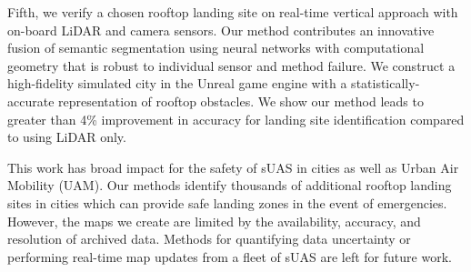 Fifth, we verify a chosen rooftop landing site on real-time vertical approach with on-board LiDAR and camera sensors. Our method contributes an innovative fusion of semantic segmentation using neural networks with computational geometry that is robust to individual sensor and method failure.  We construct a high-fidelity simulated city in the Unreal game engine with a statistically-accurate representation of rooftop obstacles. We show our method leads to greater than 4\% improvement in accuracy for landing site identification compared to using LiDAR only.

This work has broad impact for the safety of sUAS in cities as well as Urban Air Mobility (UAM). Our methods identify thousands of additional rooftop landing sites in cities which can provide safe landing zones in the event of emergencies. However, the maps we create are limited by the availability, accuracy, and resolution of archived data. Methods for quantifying data uncertainty or performing real-time map updates from a fleet of sUAS are left for future work.
